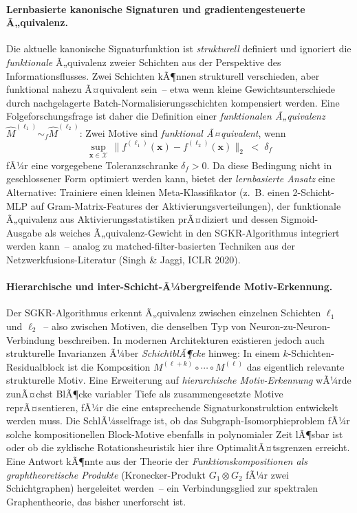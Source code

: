 ﻿\documentclass[12pt, a4paper, openany]{report}
\newcommand{\calX}{\mathcal{X}}
\begin{document}
\paragraph{Lernbasierte kanonische Signaturen und gradientengesteuerte Ã„quivalenz.}
Die aktuelle kanonische Signaturfunktion ist \emph{strukturell} definiert
und ignoriert die \emph{funktionale} Ã„quivalenz zweier Schichten aus der
Perspektive des Informationsflusses.  Zwei Schichten kÃ¶nnen strukturell
verschieden, aber funktional nahezu Ã¤quivalent sein~-- etwa wenn kleine
Gewichtsunterschiede durch nachgelagerte Batch-Normalisierungsschichten
kompensiert werden.  Eine Folgeforschungsfrage ist daher die Definition
einer \emph{funktionalen Ã„quivalenz}
$\hat{M}^{(\ell_1)} \sim_f \hat{M}^{(\ell_2)}$: Zwei Motive sind
\emph{funktional Ã¤quivalent}, wenn
\[
  \sup_{\bm{x} \in \calX}\,
  \bigl\| f^{(\ell_1)}(\bm{x}) - f^{(\ell_2)}(\bm{x}) \bigr\|_2
  \;<\; \delta_f
\]
fÃ¼r eine vorgegebene Toleranzschranke $\delta_f > 0$.  Da diese Bedingung
nicht in geschlossener Form optimiert werden kann, bietet der
\emph{lernbasierte Ansatz} eine Alternative: Trainiere einen kleinen
Meta-Klassifikator (z.~B. einen 2-Schicht-MLP auf Gram-Matrix-Features der
Aktivierungsverteilungen), der funktionale Ã„quivalenz aus Aktivierungsstatistiken
prÃ¤diziert und dessen Sigmoid-Ausgabe als weiches Ã„quivalenz-Gewicht in
den SGKR-Algorithmus integriert werden kann~-- analog zu
matched-filter-basierten Techniken aus der Netzwerkfusions-Literatur
(Singh \& Jaggi, ICLR 2020).

\paragraph{Hierarchische und inter-Schicht-Ã¼bergreifende Motiv-Erkennung.}
Der SGKR-Algorithmus erkennt Ã„quivalenz zwischen einzelnen Schichten $\ell_1$
und $\ell_2$~-- also zwischen Motiven, die denselben Typ von
Neuron-zu-Neuron-Verbindung beschreiben.  In modernen Architekturen existieren
jedoch auch strukturelle Invarianzen Ã¼ber \emph{SchichtblÃ¶cke} hinweg: In
einem $k$-Schichten-Residualblock ist die Komposition
$M^{(\ell+k)} \circ \cdots \circ M^{(\ell)}$ das eigentlich relevante
strukturelle Motiv.  Eine Erweiterung auf \emph{hierarchische Motiv-Erkennung}
wÃ¼rde zunÃ¤chst BlÃ¶cke variabler Tiefe als zusammengesetzte Motive
reprÃ¤sentieren, fÃ¼r die eine entsprechende Signaturkonstruktion entwickelt
werden muss.  Die SchlÃ¼sselfrage ist, ob das Subgraph-Isomorphieproblem fÃ¼r
solche kompositionellen Block-Motive ebenfalls in polynomialer Zeit lÃ¶sbar
ist oder ob die zyklische Rotationsheuristik hier ihre OptimalitÃ¤tsgrenzen
erreicht.  Eine Antwort kÃ¶nnte aus der Theorie der \emph{Funktionskompositionen
als graphtheoretische Produkte} (Kronecker-Produkt $G_1 \otimes G_2$ fÃ¼r
zwei Schichtgraphen) hergeleitet werden~-- ein Verbindungsglied zur
spektralen Graphentheorie, das bisher unerforscht ist.
\end{document}
